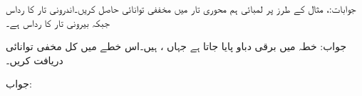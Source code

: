 جوابات:، 
مثال  کے طرز پر  لمبائی ہم محوری تار میں مخففی توانائی حاصل کریں۔اندرونی تار کا رداس  جبکہ بیرونی تار کا رداس  ہے۔

جواب:
خطہ  میں  برقی دباو پایا جاتا ہے جہاں ،  ہیں۔اس خطے میں کل مخفی توانائی دریافت کریں۔

جواب:

